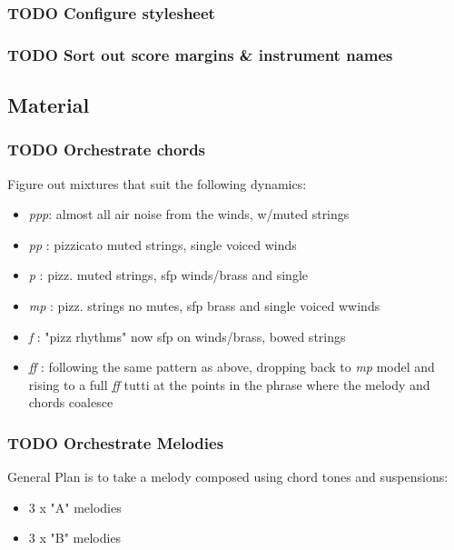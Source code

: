 \documentclass[11pt]{article}
\begin{document}
\subsubsection{{\bfseries\sffamily TODO} Configure stylesheet}
\label{sec:org5af1005}
\subsubsection{{\bfseries\sffamily TODO} Sort out score margins \& instrument names}
\label{sec:org9932c40}






\subsection{Material}
\label{sec:orgfed430c}

\subsubsection{{\bfseries\sffamily TODO} Orchestrate chords}
\label{sec:orgafa9622}
Figure out mixtures that suit the following dynamics: 

\begin{itemize}
\item \emph{ppp}: almost all air noise from the winds, w/muted strings
\item \emph{pp} : pizzicato muted strings, single voiced winds
\item \emph{p}  : pizz. muted strings, sfp winds/brass and single
\item \emph{mp} : pizz. strings no mutes, sfp brass and single voiced wwinds
\item \emph{f}  : "pizz rhythms" now sfp on winds/brass, bowed strings
\item \emph{ff} : following the same pattern as above, dropping back to \emph{mp}
model and rising to a full \emph{ff} tutti at the points in the phrase
where the melody and chords coalesce
\end{itemize}


\subsubsection{{\bfseries\sffamily TODO} Orchestrate Melodies}
\label{sec:orgf46643e}
General Plan is to take a melody composed using chord tones and
suspensions:
\begin{itemize}
\item 3 x "A" melodies
\item 3 x "B" melodies
\end{itemize}
\end{document}
